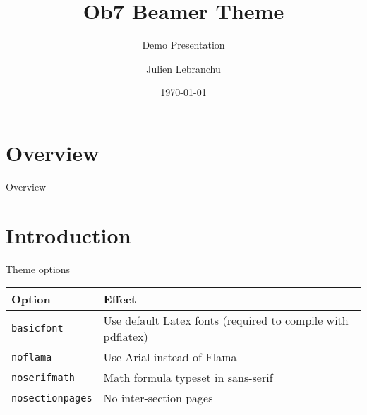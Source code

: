 \documentclass[compress,aspectratio=169]{beamer}
\title{Ob7 Beamer Theme}
\subtitle{Demo Presentation}
\date{\today}
\author{Julien Lebranchu}
\institute{OB7\\{\bf IRD}}
\begin{document}

\maketitle


\section*{Overview}
\begin{frame}{Overview}
    \tableofcontents[hideallsubsections]
\end{frame}

\section{Introduction}

\begin{frame}{Theme options}
    \begin{table}[]
        \begin{tabularx}{\linewidth}{l>{\raggedright}X}
            \toprule
            \textbf{Option}			& \textbf{Effect} \tabularnewline
            \midrule
            \texttt{basicfont}		& Use default Latex fonts (required to compile
            with pdflatex) \tabularnewline
            \texttt{noflama}		& Use Arial instead of Flama \tabularnewline
            \texttt{noserifmath}		& Math formula typeset in sans-serif \tabularnewline
            \texttt{nosectionpages} & No inter-section pages \tabularnewline
            \bottomrule
        \end{tabularx}
        \label{tab:options}
    \end{table}
\end{frame}
\end{document}
